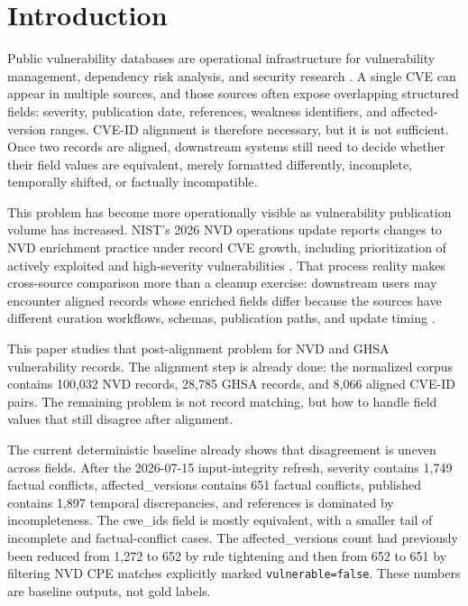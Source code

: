 \section{Introduction}

Public vulnerability databases are operational infrastructure for vulnerability management, dependency risk analysis, and security research \cite{NVDUsers2024,Churakova2026VEX,Mandl2026VulnDetection}. A single CVE can appear in multiple sources, and those sources often expose overlapping structured fields: severity, publication date, references, weakness identifiers, and affected-version ranges. CVE-ID alignment is therefore necessary, but it is not sufficient. Once two records are aligned, downstream systems still need to decide whether their field values are equivalent, merely formatted differently, incomplete, temporally shifted, or factually incompatible.

This problem has become more operationally visible as vulnerability publication volume has increased. NIST's 2026 NVD operations update reports changes to NVD enrichment practice under record CVE growth, including prioritization of actively exploited and high-severity vulnerabilities \cite{NVDOperations2026}. That process reality makes cross-source comparison more than a cleanup exercise: downstream users may encounter aligned records whose enriched fields differ because the sources have different curation workflows, schemas, publication paths, and update timing \cite{NVDProcess2026,NVDStatus2026,GHSAAbout2026,GHSARepo2026}.

This paper studies that post-alignment problem for NVD and GHSA vulnerability records. The alignment step is already done: the normalized corpus contains 100,032 NVD records, 28,785 GHSA records, and 8,066 aligned CVE-ID pairs. The remaining problem is not record matching, but how to handle field values that still disagree after alignment.

The current deterministic baseline already shows that disagreement is uneven across fields. After the 2026-07-15 input-integrity refresh, severity contains 1,749 factual conflicts, affected\_versions contains 651 factual conflicts, published contains 1,897 temporal discrepancies, and references is dominated by incompleteness. The cwe\_ids field is mostly equivalent, with a smaller tail of incomplete and factual-conflict cases. The affected\_versions count had previously been reduced from 1,272 to 652 by rule tightening and then from 652 to 651 by filtering NVD CPE matches explicitly marked \texttt{vulnerable=false}. These numbers are baseline outputs, not gold labels.

